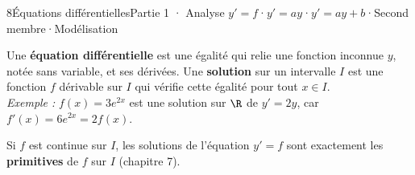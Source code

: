 
\begin{ouverture}[equadiff]{8}{Équations différentielles}{Partie 1 · Analyse}
  {$y'=f$\enspace·\enspace $y'=ay$\enspace·\enspace $y'=ay+b$\enspace·\enspace Second membre\enspace·\enspace Modélisation}
\end{ouverture}

\essentiel


\begin{definition}
Une \textbf{équation différentielle} est une égalité qui relie une fonction inconnue $y$, notée sans variable, et ses
dérivées. Une \textbf{solution} sur un intervalle $I$ est une fonction $f$ dérivable sur $I$ qui vérifie cette égalité pour tout
$x\in I$.\\[1mm]
\emph{Exemple :} $f(x)=3e^{2x}$ est une solution sur $\R$ de $y'=2y$, car $f'(x)=6e^{2x}=2f(x)$.
\end{definition}

\begin{propriete}[L'équation $y'=f$]
Si $f$ est continue sur $I$, les solutions de l'équation $y'=f$ sont exactement les \textbf{primitives} de $f$ sur $I$ (chapitre 7).
\end{propriete}


